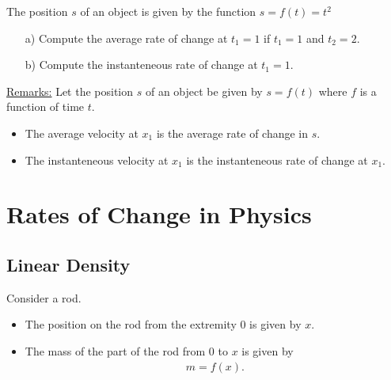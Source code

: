 \documentclass[12pt,a4paper]{article}
\newcounter{example}[section]
\begin{document}
\vspace*{16pt}

\begin{example}
The position $s$ of an object is given by the function $s = f(t) = t^2$
	\begin{enumerate}
	\item[a)] Compute the average rate of change at $t_1 = 1$ if $t_1 = 1$ and $t_2 = 2$.
	\item[b)] Compute the instanteneous rate of change at $t_1 = 1$. 
	\end{enumerate}
\end{example}

\vfill

\underline{Remarks:} Let the position $s$ of an object be given by $s = f(t)$ where $f$ is a function of time $t$.
	\begin{itemize}
	\item The average velocity at $x_1$ is the average rate of change in $s$.
	\item The instanteneous velocity at $x_1$ is the instanteneous rate of change at $x_1$.
	\end{itemize}

\newpage

\section{Rates of Change in Physics}

	\subsection{Linear Density}
	Consider a rod.
	
	\vspace*{16pt}
	
	\begin{center}
	\end{center}
	
	\vspace*{16pt}
		
		\begin{itemize}
		\item The position on the rod from the extremity $0$ is given by $x$.
		\item The mass of the part of the rod from $0$ to $x$ is given by
			\begin{align*}
			m = f(x) .
			\end{align*}
		\end{itemize}
		
\end{document}
